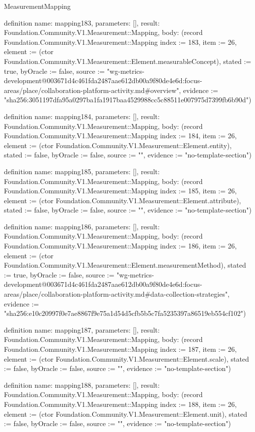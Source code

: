 \begin{lexlean}{MeasurementMapping}
\begin{semanticmodule}
definition{
  name: mapping183,
  parameters: [],
  result: Foundation.Community.V1.Measurement::Mapping,
  body: (record Foundation.Community.V1.Measurement::Mapping {index := 183, item := 26, element := (ctor Foundation.Community.V1.Measurement::Element.measurableConcept), stated := true, byOracle := false, source := "wg-metrics-development@003671d4c461fda2487aae612db00a9f80de4e6d:focus-areas/place/collaboration-platform-activity.md#overview", evidence := "sha256:3051197dfa95a0297ba1fa1917baa4529988cc5c88511e007975d7399fb6b90d"})
}

definition{
  name: mapping184,
  parameters: [],
  result: Foundation.Community.V1.Measurement::Mapping,
  body: (record Foundation.Community.V1.Measurement::Mapping {index := 184, item := 26, element := (ctor Foundation.Community.V1.Measurement::Element.entity), stated := false, byOracle := false, source := "", evidence := "no-template-section"})
}

definition{
  name: mapping185,
  parameters: [],
  result: Foundation.Community.V1.Measurement::Mapping,
  body: (record Foundation.Community.V1.Measurement::Mapping {index := 185, item := 26, element := (ctor Foundation.Community.V1.Measurement::Element.attribute), stated := false, byOracle := false, source := "", evidence := "no-template-section"})
}

definition{
  name: mapping186,
  parameters: [],
  result: Foundation.Community.V1.Measurement::Mapping,
  body: (record Foundation.Community.V1.Measurement::Mapping {index := 186, item := 26, element := (ctor Foundation.Community.V1.Measurement::Element.measurementMethod), stated := true, byOracle := false, source := "wg-metrics-development@003671d4c461fda2487aae612db00a9f80de4e6d:focus-areas/place/collaboration-platform-activity.md#data-collection-strategies", evidence := "sha256:e10c20997f0e7ae8867f9e75a1d54d5cfb5b5c7fa5235397a86519eb554cf102"})
}

definition{
  name: mapping187,
  parameters: [],
  result: Foundation.Community.V1.Measurement::Mapping,
  body: (record Foundation.Community.V1.Measurement::Mapping {index := 187, item := 26, element := (ctor Foundation.Community.V1.Measurement::Element.scale), stated := false, byOracle := false, source := "", evidence := "no-template-section"})
}

definition{
  name: mapping188,
  parameters: [],
  result: Foundation.Community.V1.Measurement::Mapping,
  body: (record Foundation.Community.V1.Measurement::Mapping {index := 188, item := 26, element := (ctor Foundation.Community.V1.Measurement::Element.unit), stated := false, byOracle := false, source := "", evidence := "no-template-section"})
}


\end{semanticmodule}
\end{lexlean}
